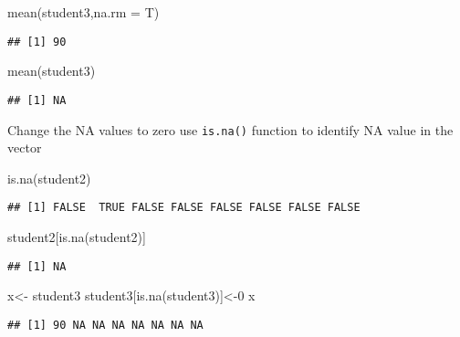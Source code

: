 \documentclass[
]{article}
\newenvironment{Shaded}{\begin{snugshade}}{\end{snugshade}}
\newcommand{\AttributeTok}[1]{\textcolor[rgb]{0.77,0.63,0.00}{#1}}
\newcommand{\DecValTok}[1]{\textcolor[rgb]{0.00,0.00,0.81}{#1}}
\newcommand{\FunctionTok}[1]{\textcolor[rgb]{0.00,0.00,0.00}{#1}}
\newcommand{\NormalTok}[1]{#1}
\newcommand{\OtherTok}[1]{\textcolor[rgb]{0.56,0.35,0.01}{#1}}
\begin{document}
\begin{Shaded}
\begin{Highlighting}[]
\FunctionTok{mean}\NormalTok{(student3,}\AttributeTok{na.rm =}\NormalTok{ T)}
\end{Highlighting}
\end{Shaded}

\begin{verbatim}
## [1] 90
\end{verbatim}

\begin{Shaded}
\begin{Highlighting}[]
\FunctionTok{mean}\NormalTok{(student3)}
\end{Highlighting}
\end{Shaded}

\begin{verbatim}
## [1] NA
\end{verbatim}

Change the NA values to zero use \texttt{is.na()} function to identify
NA value in the vector

\begin{Shaded}
\begin{Highlighting}[]
\FunctionTok{is.na}\NormalTok{(student2)}
\end{Highlighting}
\end{Shaded}

\begin{verbatim}
## [1] FALSE  TRUE FALSE FALSE FALSE FALSE FALSE FALSE
\end{verbatim}

\begin{Shaded}
\begin{Highlighting}[]
\NormalTok{student2[}\FunctionTok{is.na}\NormalTok{(student2)]}
\end{Highlighting}
\end{Shaded}

\begin{verbatim}
## [1] NA
\end{verbatim}

\begin{Shaded}
\begin{Highlighting}[]
\NormalTok{x}\OtherTok{\textless{}{-}}\NormalTok{ student3}
\NormalTok{student3[}\FunctionTok{is.na}\NormalTok{(student3)]}\OtherTok{\textless{}{-}}\DecValTok{0}
\NormalTok{x}
\end{Highlighting}
\end{Shaded}

\begin{verbatim}
## [1] 90 NA NA NA NA NA NA NA
\end{verbatim}
\end{document}
